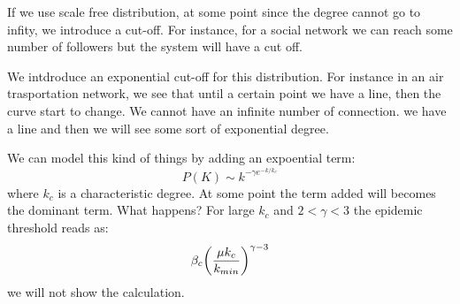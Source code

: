 \documentclass[../main/main.tex]{subfiles}
\begin{document}
If we use scale free distribution, at some point since the degree cannot go to infity, we introduce a cut-off. For instance, for a social network we can reach some number of followers but the system will have a cut off.

 We intdroduce an exponential cut-off for this distribution. For instance in an air trasportation network, we see that until a certain point we have a line, then the curve start to change. We cannot have an infinite number of connection. we have a line and then we will see some sort of exponential degree.

 We can model this kind of things by adding an expoential term:
 \begin{equation*}
   P(K) \sim k^{- \gamma   e^{-k/k_c} }
 \end{equation*}
where \( k_c \) is a characteristic degree. At some point the term added will becomes the dominant term. What happens? For large \( k_c \) and \( 2 < \gamma < 3  \) the epidemic threshold reads as:
\begin{equation*}
  \beta _c \qty(\frac{\mu k_c}{k_{min}})^{\gamma -3 }
\end{equation*}
we will not show the calculation.
\end{document}
